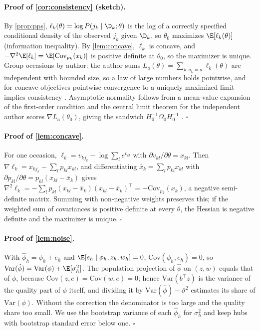 \paragraph{Proof of \cref{cor:consistency} (sketch).}
By \cref{prop:pps}, $\ell_k(\theta) = \log P(j_k \mid \D_k; \theta)$ is the log of a correctly specified conditional
density of the observed $j_k$ given $\D_k$, so $\theta_0$ maximizes $\E[\ell_k(\theta)]$ (information inequality).
By \cref{lem:concave}, $\ell_k$ is concave, and $-\nabla^2 \E[\ell_k] = \E[\mathrm{Cov}_{p_k}(x_k)]$ is positive
definite at $\theta_0$, so the maximizer is unique. Group occasions by author: the author sums
$L_a(\theta) = \sum_{k: a_k = a} \ell_k(\theta)$ are independent with bounded size, so a law of large numbers holds
pointwise, and for concave objectives pointwise convergence to a uniquely maximized limit implies consistency
\citep[Thm.~2.7]{newey1994large}. Asymptotic normality follows from a mean-value expansion of the first-order
condition and the central limit theorem for the independent author scores $\nabla L_a(\theta_0)$, giving the
sandwich $H_0^{-1} \Omega_0 H_0^{-1}$ \citep[Thm.~3.1]{newey1994large}. \hfill$\square$

\paragraph{Proof of \cref{lem:concave}.}
For one occasion, $\ell_k = v_{kj_k} - \log \sum_l e^{v_{kl}}$ with $\partial v_{kl} / \partial \theta = x_{kl}$.
Then $\nabla \ell_k = x_{kj_k} - \sum_l p_{kl} x_{kl}$, and differentiating $\bar x_k = \sum_l p_{kl} x_{kl}$ with
$\partial p_{kl} / \partial \theta = p_{kl}(x_{kl} - \bar x_k)$ gives $\nabla^2 \ell_k = -\sum_l p_{kl}(x_{kl} -
\bar x_k)(x_{kl} - \bar x_k)^\top = -\mathrm{Cov}_{p_k}(x_k)$, a negative semi-definite matrix. Summing with
non-negative weights preserves this; if the weighted sum of covariances is positive definite at every $\theta$, the
Hessian is negative definite and the maximizer is unique. \hfill$\square$

\paragraph{Proof of \cref{lem:noise}.}
With $\hat\phi_h = \phi_h + e_h$ and $\E[e_h \mid \phi_h, z_h, w_h] = 0$, $\mathrm{Cov}(\phi_h, e_h) = 0$, so
$\mathrm{Var}(\hat\phi) = \mathrm{Var}(\phi) + \E[\sigma_h^2]$. The population projection of $\hat\phi$ on $(z, w)$
equals that of $\phi$, because $\mathrm{Cov}(z, e) = \mathrm{Cov}(w, e) = 0$; hence $\mathrm{Var}(b^\top z)$ is the
variance of the quality part of $\phi$ itself, and dividing it by $\mathrm{Var}(\hat\phi) - \bar\sigma^2$ estimates
its share of $\mathrm{Var}(\phi)$. Without the correction the denominator is too large and the quality share too
small. We use the bootstrap variance of each $\hat\phi_h$ for $\sigma_h^2$ and keep hubs with bootstrap standard error
below one. \hfill$\square$

